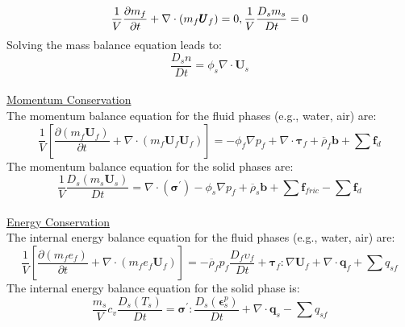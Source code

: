 \documentclass[preprint,12pt]{elsarticle}
\begin{document}
\begin{equation}
    \label{massbalance}
   \frac{1}{V}\frac{\partial m_f}{\partial t} + \nabla \cdot  (m_f \pmb{U}_f)= 0, \\ 
   \frac{1}{V}\frac{D_sm_s}{Dt} = 0    
\end {equation}
%
Solving the mass balance equation leads to:
%
%
\begin{equation}
  \frac{D_s n}{Dt} = \phi_s \nabla \cdot \pmb{U}_s  
\end {equation}
%
%
\underline{\hspace{5in}}\\
\underline{\textsf{Momentum Conservation}}\\
The momentum balance equation for the fluid phases (e.g., water, air) are:\\
%
%
\begin{equation}
     \frac{1}{V} \left[ \frac{\partial (m_f \pmb{U}_f)}{\partial t} + \nabla \cdot  (m_f \pmb{U}_f \pmb{U}_f) \right] = - \phi_f \nabla p_f  +  \nabla \cdot \pmb{\tau}_f + \overline{\rho}_f \pmb{b} +  \sum \pmb{f}_{d}
\end {equation}
%
%
The momentum balance equation for the solid phases are:\\
%
%
\begin{equation}
     \frac{1}{V}\frac{D_s(m_s \pmb{U}_s)}{Dt} = 
    \nabla \cdot (\pmb{\sigma}^\prime) - \phi_s \nabla p_f 
    + \overline{\rho}_s \pmb{b} +  \sum \pmb{f}_{fric}    -  \sum \pmb{f}_{d}
\end {equation}
%
%
\underline{\hspace{5in}}\\
\underline{\textsf{Energy Conservation}}\\
The internal energy balance equation for the fluid phases (e.g., water, air) are:
%
%
\begin{equation}
    \label{fluidenergy}
     \frac{1}{V} \left[ \frac{\partial (m_f e_f)}{\partial t} + \nabla \cdot  (m_f e_f \pmb{U}_f) \right]  = 
    -\overline{\rho}_f p_f  \frac{D_f\upsilon_f}{Dt} + \pmb{\tau}_f : \nabla \pmb{U}_f + \nabla \cdot \pmb{q}_f +  \sum q_{sf}
\end {equation}
%
%
The internal energy balance equation for the solid phase is:
%
%
\begin{equation}
    \label{solidenergy}
     \frac{m_s}{V}  c_v \frac{D_s( T_s)}{Dt} = \pmb{\sigma}^\prime: \frac{D_s( \pmb{\epsilon}_s^p)}{Dt} + \nabla \cdot \pmb{q}_s -  \sum q_{sf} 
\end {equation}
\end{document}
